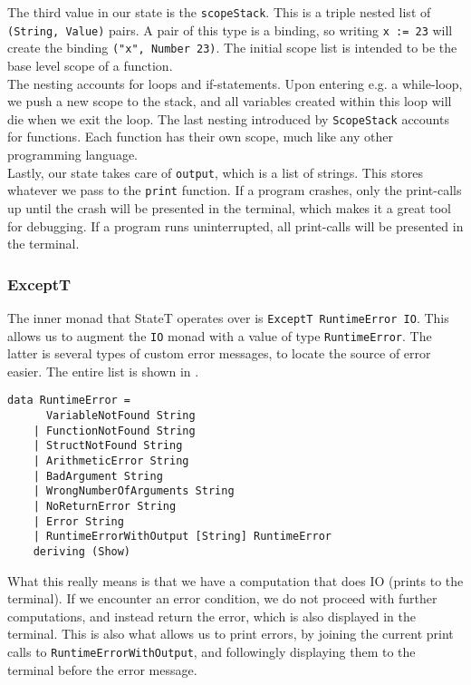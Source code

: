 The third value in our state is the \texttt{scopeStack}. This is a triple nested list of \texttt{(String, Value)} pairs. A pair of this type is a binding, so writing \texttt{x := 23} will create the binding \texttt{("x", Number 23)}. The initial scope list is intended to be the base level scope of a function. \\

The nesting accounts for loops and if-statements. Upon entering e.g. a while-loop, we push a new scope to the stack, and all variables created within this loop will die when we exit the loop. The last nesting introduced by \texttt{ScopeStack} accounts for functions. Each function has their own scope, much like any other programming language. \\

Lastly, our state takes care of \texttt{output}, which is a list of strings. This stores whatever we pass to the \texttt{print} function. If a program crashes, only the print-calls up until the crash will be presented in the terminal, which makes it a great tool for debugging. If a program runs uninterrupted, all print-calls will be presented in the terminal.

\subsubsection{ExceptT}

The inner monad that StateT operates over is \texttt{ExceptT RuntimeError IO}. This allows us to augment the \texttt{IO} monad with a value of type \texttt{RuntimeError}. The latter is several types of custom error messages, to locate the source of error easier. The entire list is shown in . \\

\begin{lstlisting}[caption={All error messages to be encountered in Psnodig.}, captionpos=b, label={psnodigErrorMsgs}]
data RuntimeError =
      VariableNotFound String
    | FunctionNotFound String
    | StructNotFound String
    | ArithmeticError String
    | BadArgument String
    | WrongNumberOfArguments String
    | NoReturnError String
    | Error String
    | RuntimeErrorWithOutput [String] RuntimeError
    deriving (Show)
\end{lstlisting}

What this really means is that we have a computation that does IO (prints to the terminal). If we encounter an error condition, we do not proceed with further computations, and instead return the error, which is also displayed in the terminal. This is also what allows us to print errors, by joining the current print calls to \texttt{RuntimeErrorWithOutput}, and followingly displaying them to the terminal before the error message.

